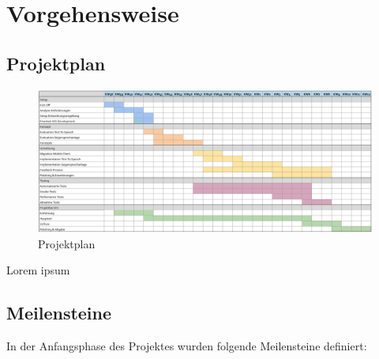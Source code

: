 \section{Vorgehensweise}

\subsection*{Projektplan}

\begin{figure}[h]
    \centering
    \begin{minipage}[b]{\textwidth}
        \includegraphics[width=\textwidth]{graphics/projektplan}
        \caption{Projektplan}
    \end{minipage}\label{fig:projektplan}
\end{figure}

Lorem ipsum
\clearpage

\subsection*{Meilensteine}

In der Anfangsphase des Projektes wurden folgende Meilensteine definiert:

